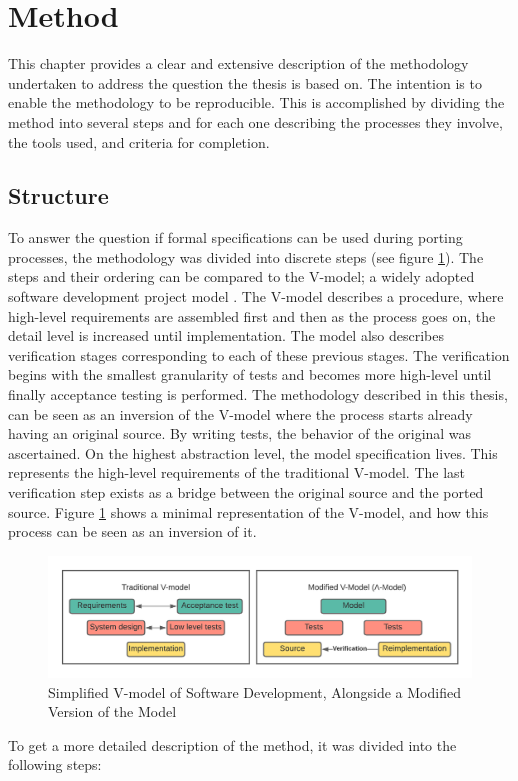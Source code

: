 
\section{Method}\label{method}
This chapter provides a clear and extensive description of the methodology undertaken to address the question the thesis is based on. The intention is to enable the methodology to be reproducible. This is accomplished by dividing the method into several steps and for each one describing the processes they involve, the tools used, and criteria for completion.
 
\subsection{Structure}\label{structure}

To answer the question if formal specifications can be used during porting processes, the methodology was divided into discrete steps (see figure \ref{fig:vmodel}).
The steps and their ordering can be compared to the V-model; a widely adopted software development project model \cite{VEEMODEL}. The V-model describes a procedure, where high-level requirements are assembled first and then as the process goes on, the detail level is increased until implementation. The model also describes verification stages corresponding to each of these previous stages. The verification begins with the smallest granularity of tests and becomes more high-level until finally acceptance testing is performed. The methodology described in this thesis, can be seen as an inversion of the V-model where the process starts already having an original source. By writing tests, the behavior of the original was ascertained. On the highest abstraction level, the model specification lives. This represents the high-level requirements of the traditional V-model. The last verification step exists as a bridge between the original source and the ported source. Figure \ref{fig:vmodel} shows a minimal representation of the V-model, and how this process can be seen as an inversion of it.   

\begin{figure}[H]
\centerline{\includegraphics[width=5in]{V-model_.png}}
\caption{Simplified V-model of Software Development, Alongside a Modified Version of the Model}
\label{fig:vmodel}
\end{figure}
\newpage
To get a more detailed description of the method, it was divided into the following steps: 

